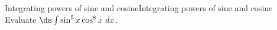 


\begin{example}{Integrating powers of sine and cosine}{Integrating powers of sine and cosine}\label{Odd Power of Sine}
Evaluate $\ds\int\sin^5x\cos^8x\ dx$.
\end{example}

